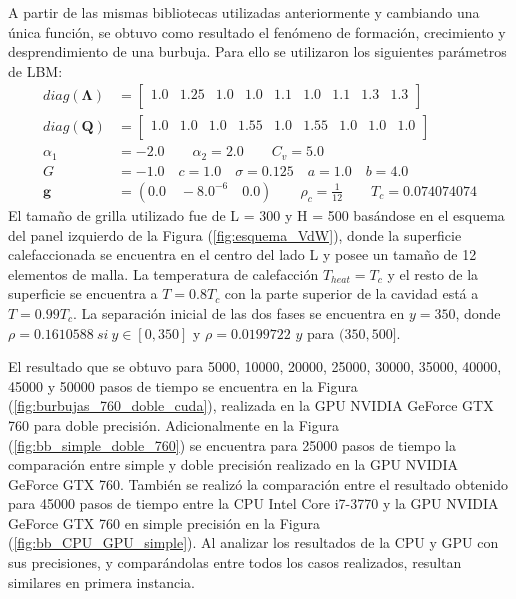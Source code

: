 A partir de las mismas bibliotecas utilizadas anteriormente y cambiando una única función, se obtuvo como resultado el fenómeno de formación, crecimiento y desprendimiento de una burbuja. Para ello se utilizaron los siguientes parámetros de LBM:
{\footnotesize \begin{align*}
diag(\mathbf{\Lambda}) & = 
\begin{bmatrix}
1.0 & 1.25 & 1.0 & 1.0 & 1.1 & 1.0 & 1.1 & 1.3 & 1.3 \\
\end{bmatrix}\\
diag(\mathbf{Q}) & = 
\begin{bmatrix}
1.0 & 1.0 & 1.0 & 1.55 & 1.0 & 1.55 & 1.0 & 1.0 & 1.0 \\
\end{bmatrix}\\
\alpha_{1} & = -2.0 \qquad 	\alpha_{2} = 2.0 \qquad C_{v} = 5.0\\
G & = -1.0 \quad c = 1.0 \quad \sigma = 0.125 \quad a = 1.0 \quad b = 4.0 \\
\mathbf{g} & = (0.0 \quad -8.0^{-6} \quad 0.0 ) \qquad \rho_c = \frac{1}{12} \qquad T_c = 0.074074074
\end{align*}}
El tamaño de grilla utilizado fue de L = 300 y H = 500 basándose en el esquema del panel izquierdo de la Figura (\ref{fig:esquema_VdW}), donde la superficie calefaccionada se encuentra en el centro del lado L y posee un tamaño de 12 elementos de malla. La temperatura de calefacción $T_{heat} = T_c$  y el resto de la superficie se encuentra a $T = 0.8 T_c$ con la parte superior de la cavidad está a $T = 0.99 T_c$. La separación inicial de las dos fases se encuentra en $y = 350$, donde $\rho = 0.1610588 \> si \> y \in [0,350]$ y $\rho = 0.0199722$ $y$ para $(350,500]$.

El resultado que se obtuvo para 5000, 10000, 20000, 25000, 30000, 35000, 40000, 45000 y 50000 pasos de tiempo se encuentra en la Figura (\ref{fig:burbujas_760_doble_cuda}), realizada en la GPU NVIDIA GeForce GTX 760 para doble precisión. Adicionalmente en la Figura (\ref{fig:bb_simple_doble_760}) se encuentra para 25000 pasos de tiempo la comparación entre simple y doble precisión realizado en la GPU NVIDIA GeForce GTX 760. También se realizó la comparación entre el resultado obtenido para 45000 pasos de tiempo entre la CPU Intel Core i7-3770 y la GPU NVIDIA GeForce GTX 760 en simple precisión  en la Figura (\ref{fig:bb_CPU_GPU_simple}). Al analizar los resultados de la CPU y GPU con sus precisiones, y comparándolas entre todos los casos realizados, resultan similares en primera instancia.


